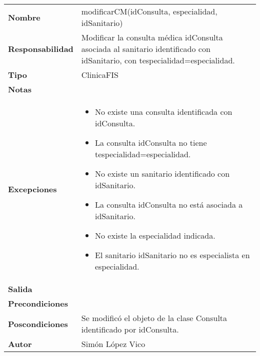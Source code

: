 \documentclass[11pt,a4paper]{article}
\newenvironment{itemizenomargins}
    {\begin{minipage}[t]{1\linewidth}\begin{itemize}}
    {\end{itemize}\end{minipage}}
\begin{document}
\begin{table}[H]
	\centering
	\label{my-label}
	\begin{tabularx}{\textwidth}{l|X}
		\textbf{Nombre}          & modificarCM(idConsulta, especialidad, idSanitario) \\
		\textbf{Responsabilidad} & Modificar la consulta médica idConsulta asociada al sanitario identificado con idSanitario, con tespecialidad=especialidad. \\
		\textbf{Tipo}            & ClinicaFIS \\
		\textbf{Notas}           &  \\
		\textbf{Excepciones}     &
		\begin{itemizenomargins}
			\item No existe una consulta identificada con idConsulta.
			\item La consulta idConsulta no tiene tespecialidad=especialidad.
			\item No existe un sanitario identificado con idSanitario. 
			\item La consulta idConsulta no está asociada a idSanitario.
			\item No existe la especialidad indicada.
			\item El sanitario idSanitario no es especialista en especialidad.
		\end{itemizenomargins} \\
		\textbf{Salida}          &  \\
		\textbf{Precondiciones}  &  \\
		\textbf{Poscondiciones}  & Se modificó el objeto de la clase Consulta identificado por idConsulta. \\
		\textbf{Autor}			 & Simón López Vico
	\end{tabularx}
\end{table}
\end{document}
